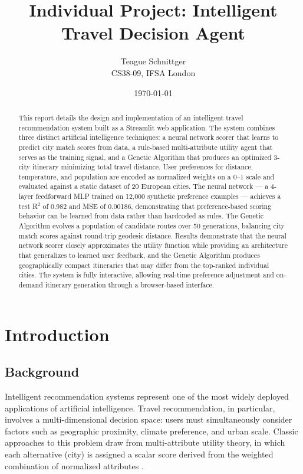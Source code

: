 \documentclass[12pt]{article}
\title{Individual Project: Intelligent Travel Decision Agent}
\author{Teague Schnittger \\
CS38-09, IFSA London}
\date{\today}
\begin{document}
\maketitle

\begin{abstract}
This report details the design and implementation of an intelligent travel recommendation system built as a Streamlit web application. The system combines three distinct artificial intelligence techniques: a neural network scorer that learns to predict city match scores from data, a rule-based multi-attribute utility agent that serves as the training signal, and a Genetic Algorithm that produces an optimized 3-city itinerary minimizing total travel distance. User preferences for distance, temperature, and population are encoded as normalized weights on a 0--1 scale and evaluated against a static dataset of 20 European cities. The neural network --- a 4-layer feedforward MLP trained on 12,000 synthetic preference examples --- achieves a test R$^2$ of 0.982 and MSE of 0.00186, demonstrating that preference-based scoring behavior can be learned from data rather than hardcoded as rules. The Genetic Algorithm evolves a population of candidate routes over 50 generations, balancing city match scores against round-trip geodesic distance. Results demonstrate that the neural network scorer closely approximates the utility function while providing an architecture that generalizes to learned user feedback, and the Genetic Algorithm produces geographically compact itineraries that may differ from the top-ranked individual cities. The system is fully interactive, allowing real-time preference adjustment and on-demand itinerary generation through a browser-based interface.
\end{abstract}

\clearpage

\section{Introduction}

\subsection{Background}
Intelligent recommendation systems represent one of the most widely deployed applications of artificial intelligence. Travel recommendation, in particular, involves a multi-dimensional decision space: users must simultaneously consider factors such as geographic proximity, climate preference, and urban scale. Classic approaches to this problem draw from multi-attribute utility theory, in which each alternative (city) is assigned a scalar score derived from the weighted combination of normalized attributes \citep[ch.~16]{russell2020}.
\end{document}
